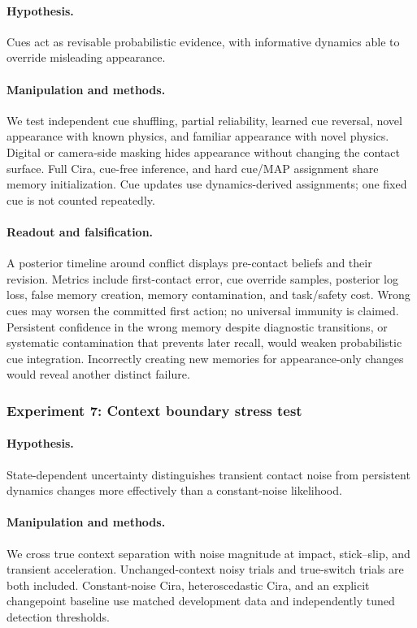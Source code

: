 \paragraph{Hypothesis.}
Cues act as revisable probabilistic evidence, with informative dynamics able to override misleading appearance.

\paragraph{Manipulation and methods.}
We test independent cue shuffling, partial reliability, learned cue reversal, novel appearance with known physics, and familiar appearance with novel physics. Digital or camera-side masking hides appearance without changing the contact surface. Full Cira, cue-free inference, and hard cue/MAP assignment share memory initialization. Cue updates use dynamics-derived assignments; one fixed cue is not counted repeatedly.

\paragraph{Readout and falsification.}
A posterior timeline around conflict displays pre-contact beliefs and their revision. Metrics include first-contact error, cue override samples, posterior log loss, false memory creation, memory contamination, and task/safety cost. Wrong cues may worsen the committed first action; no universal immunity is claimed. Persistent confidence in the wrong memory despite diagnostic transitions, or systematic contamination that prevents later recall, would weaken probabilistic cue integration. Incorrectly creating new memories for appearance-only changes would reveal another distinct failure.

\subsubsection{Experiment 7: Context boundary stress test}
\paragraph{Hypothesis.}
State-dependent uncertainty distinguishes transient contact noise from persistent dynamics changes more effectively than a constant-noise likelihood.

\paragraph{Manipulation and methods.}
We cross true context separation with noise magnitude at impact, stick--slip, and transient acceleration. Unchanged-context noisy trials and true-switch trials are both included. Constant-noise Cira, heteroscedastic Cira, and an explicit changepoint baseline use matched development data and independently tuned detection thresholds.

